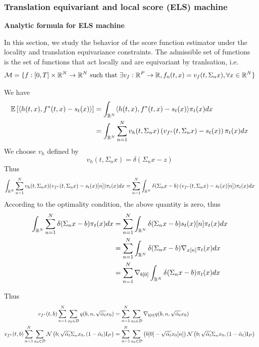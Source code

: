 \documentclass[a4paper,10pt]{article}
\begin{document}
\subsubsection{Translation equivariant and local  score (ELS) machine}
{\textbf{Analytic formula for ELS machine}}

In this section, we study the behavior of the score function estimator under the locality and translation equivariance constraints.
The admissible set of functions is the set of functions that act locally and are equivariant by tranlsation, i.e. 
\begin{equation*}
    \mathcal{M} = \{f:[0,T]\times\mathbb{R}^N \rightarrow \mathbb{R}^N \text{ such that }  \exists v_{f} : \mathbb{R}^P \rightarrow \mathbb{R}, f_n(t,x)=v_{f}(t,\Sigma_n x), \forall x\in \mathbb{R}^N\}
\end{equation*}

We have
\begin{align*}
    \mathbb{E} \left[ {\langle h(t,x),f^*(t,x) -s_t(x)\rangle} \right] &= \int_{\mathbb{R}^N} \langle h(t,x),f^*(t,x)-s_t(x) \rangle \pi_t(x) dx\\
    &= \int_{\mathbb{R}^N} \sum_{n=1}^{N} v_{h}(t,\Sigma_nx)\left(v_{f^*}(t,\Sigma_nx)-s_t(x) \right) \pi_t(x) dx\\
\end{align*}
We choose $v_{h}$ defined by
\begin{equation*}
    v_{h}(t,\Sigma_n x) = \delta(\Sigma_n x - z)
\end{equation*}
Thus
\begin{equation*}
    \int_{\mathbb{R}^N} \sum_{n=1}^{N}v_{h}(t,\Sigma_nx)(v_{f^*}(t,\Sigma_nx)-s_t(x)[n]) \pi_t(x) dx = \sum_{n=1}^{N} \int_{\mathbb{R}^N} \delta(\Sigma_nx -b)\,(v_{f^*}(t,\Sigma_nx)-s_t(x)[n])  \pi_t(x) dx
\end{equation*}
According to the optimality condition, the above quantity is zero, thus
\begin{align*}
    \int_{\mathbb{R}^N} \sum_{n=1}^{N}\delta(\Sigma_nx -b) \pi_t(x) dx &= \sum_{n=1}^{N}\int_{\mathbb{R}^N} \delta(\Sigma_nx -b) s_t(x)[n]\pi_t(x) dx \\
    &= \sum_{n=1}^{N}\int_{\mathbb{R}^N} \delta(\Sigma_nx -b) \nabla_{x[n]}\pi_t(x) dx\\
    &= \sum_{n=1}^{N}\nabla_{b[0]} \int_{\mathbb{R}^N} \delta(\Sigma_nx -b) \pi_t(x) dx\\
\end{align*}

Thus
\begin{align*}
    v_{f^*}(t,b) \sum_{n=1}^{N}\sum_{x_0  \in \mathcal{D}} q(b, n, \sqrt{\bar\alpha_t}x_0) &=  \sum_{n=1}^{N}\sum_{x_0  \in \mathcal{D}} \nabla_{b[0]}q(b, n, \sqrt{\bar\alpha_t}x_0)\\
    v_{f^*}(t,b) \sum_{n=1}^{N}\sum_{x_0  \in \mathcal{D}} \mathcal{N}\left( {b; \sqrt{\bar \alpha_t} \Sigma_n x_0, (1-\bar\alpha_t) \mathrm{I}_P} \right) &=  \sum_{n=1}^{N}\sum_{x_0  \in \mathcal{D}} \left(b[0] -  \sqrt{\bar{\alpha_t}}x_0[n]\right) \mathcal{N}\left( {b; \sqrt{\bar \alpha_t} \Sigma_n x_0, (1-\bar\alpha_t) \mathrm{I}_P} \right)\\
\end{align*}
\end{document}
